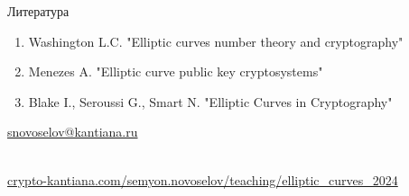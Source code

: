 \documentclass{beamer}
\begin{document}
	\begin{frame}{Литература}
		\nocite{Menezes1993}\nocite{Blake1999}\nocite{Washington2008}
		
		\begin{enumerate}
			\item[\structure{\faBook}] Washington L.C. "Elliptic curves number theory and cryptography"%
			\vspace{0.5em}
			
			\item[\structure{\faBook}] Menezes A. "Elliptic curve public key cryptosystems"
			\vspace{0.5em}
			
			\item[\structure{\faBook}] Blake I., Seroussi G., Smart N. "Elliptic Curves in Cryptography"
		\end{enumerate}
		
		\begin{center}
			\begin{tcolorbox}[enhanced,hbox,colback=block-green-color-bg,colframe=subsection-color!120,title=Контакты,center title]
				\begin{varwidth}{\textwidth}
					\begin{center}
						\href{mailto:snovoselov@kantiana.ru}{snovoselov@kantiana.ru}
					\end{center}
				\end{varwidth}
			\end{tcolorbox}	
		\end{center}
		
		\\
		{\footnotesize
			\href{https://crypto-kantiana.com/semyon.novoselov/teaching/elliptic_curves_2024}{crypto-kantiana.com/semyon.novoselov/teaching/elliptic\_curves\_2024}
		}
		
	\end{frame}
	
\end{document}
